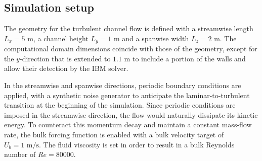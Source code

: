 \documentclass[12pt, a4paper, twoside, openright]{book}
\begin{document}
\subsection{Simulation setup}
\label{sec:periodic-channel-setup}
The geometry for the turbulent channel flow is defined with a streamwise length $L_x = 5 \text{ m}$, a channel height $L_y = 1 \text{ m}$ and a spanwise width $L_z = 2 \text{ m}$. The computational domain dimensions coincide with those of the geometry, except for the $y$-direction that is extended to $1.1 \text{ m}$ to include a portion of the walls and allow their detection by the IBM solver.

In the streamwise and spanwise directions, periodic boundary conditions are applied, with a synthetic noise generator to anticipate the laminar-to-turbulent transition at the beginning of the simulation. Since periodic conditions are imposed in the streamwise direction, the flow would naturally dissipate its kinetic energy. To counteract this momentum decay and maintain a constant mass-flow rate, the bulk forcing function is enabled with a bulk velocity target of $U_b = 1 \text{ m/s}$. The fluid viscosity is set in order to result in a bulk Reynolds number of $Re = 80000$.
\end{document}

